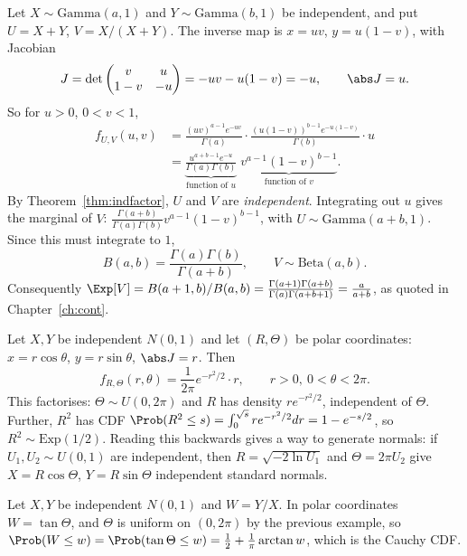 \begin{example}\label{ex:gammabeta}
Let $X\sim\mathrm{Gamma}(a,1)$ and $Y\sim\mathrm{Gamma}(b,1)$ be independent, and put
$U=X+Y$, $V=X/(X+Y)$. The inverse map is $x=uv$, $y=u(1-v)$, with Jacobian
\[
J=\det\begin{pmatrix}v&u\\1-v&-u\end{pmatrix}=-uv-u(1-v)=-u,\qquad\abs J=u.
\]
So for $u>0$, $0<v<1$,
\begin{align*}
f_{U,V}(u,v)&=\frac{(uv)^{a-1}e^{-uv}}{\Gamma(a)}\cdot\frac{(u(1-v))^{b-1}e^{-u(1-v)}}{\Gamma(b)}\cdot u\\
&=\underbrace{\frac{u^{a+b-1}e^{-u}}{\Gamma(a)\Gamma(b)}}_{\text{function of }u}\;
\underbrace{v^{a-1}(1-v)^{b-1}}_{\text{function of }v}.
\end{align*}
By Theorem~\ref{thm:indfactor}, $U$ and $V$ are \emph{independent}. Integrating out
$u$ gives the marginal of $V$: $\frac{\Gamma(a+b)}{\Gamma(a)\Gamma(b)}v^{a-1}(1-v)^{b-1}$, with
$U\sim\mathrm{Gamma}(a+b,1)$. Since this must integrate to $1$,
\[
B(a,b)=\frac{\Gamma(a)\Gamma(b)}{\Gamma(a+b)},\qquad V\sim\mathrm{Beta}(a,b).
\]
Consequently $\Exp[V]=B(a+1,b)/B(a,b)=\frac{\Gamma(a+1)\Gamma(a+b)}{\Gamma(a)\Gamma(a+b+1)}
=\frac a{a+b}$, as quoted in Chapter~\ref{ch:cont}.
\end{example}

\begin{example}\label{ex:boxmuller}
Let $X,Y$ be independent $N(0,1)$ and let $(R,\Theta)$ be polar coordinates:
$x=r\cos\theta$, $y=r\sin\theta$, $\abs J=r$. Then
\[
f_{R,\Theta}(r,\theta)=\frac1{2\pi}e^{-r^2/2}\cdot r,\qquad r>0,\ 0<\theta<2\pi .
\]
This factorises: $\Theta\sim U(0,2\pi)$ and $R$ has density $re^{-r^2/2}$,
independent of $\Theta$. Further, $R^2$ has CDF
$\Prob(R^2\le s)=\int_0^{\sqrt s}re^{-r^2/2}dr=1-e^{-s/2}$, so $R^2\sim\mathrm{Exp}(1/2)$.
Reading this backwards gives a way to generate normals: if $U_1,U_2\sim U(0,1)$
are independent, then $R=\sqrt{-2\ln U_1}$ and $\Theta=2\pi U_2$ give
$X=R\cos\Theta$, $Y=R\sin\Theta$ independent standard normals.
\end{example}

\begin{example}
Let $X,Y$ be independent $N(0,1)$ and $W=Y/X$. In polar coordinates
$W=\tan\Theta$, and $\Theta$ is uniform on $(0,2\pi)$ by the previous example, so
$\Prob(W\le w)=\Prob(\tan\Theta\le w)=\frac12+\frac1\pi\arctan w$, which is the
Cauchy CDF.
\end{example}

